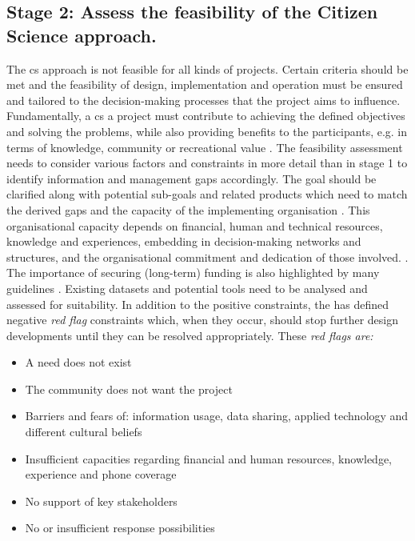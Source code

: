 \subsection{Stage 2: Assess the feasibility of the Citizen Science approach.}
The \acrlong{cs} approach is not feasible for all kinds of projects. Certain criteria should be met and the feasibility of design, implementation and operation must be ensured and tailored to the decision-making processes that the project aims to influence. Fundamentally, a \acrshort{cs} a project must contribute to achieving the defined objectives and solving the problems, while also providing benefits to the participants, e.g. in terms of knowledge, community or recreational value \autocite{escaeuropeancitizenscienceassociationTenPrinciplesCitizen2015,fraislCitizenScienceEnvironmental2022}. The feasibility assessment needs to consider various factors and constraints in more detail than in stage 1 to identify information and management gaps accordingly. The goal should be clarified along with potential sub-goals and related products which need to match the derived gaps and the capacity of the implementing organisation \autocite{ifrcCommunityBasedSurveillanceGuiding2017,minkmanCitizenScienceWater2015}. This organisational capacity depends on financial, human and technical resources, knowledge and experiences, embedding in decision-making networks and structures, and the organisational commitment and dedication of those involved. \autocite{fraislCitizenScienceEnvironmental2022,ifrcCommunityBasedSurveillanceGuiding2017}. The importance of securing (long-term) funding is also highlighted by many guidelines \autocite{cervoniImplementingIntegratedWater2008,minkmanCitizenScienceWater2015,sharpeCommunityBasedEcological2006, whitelawEstablishingCanadianCommunity2003}. Existing datasets and potential tools need to be analysed and assessed for suitability. In addition to the positive constraints, the \autocite{ ifrcCommunityBasedSurveillanceGuiding2017} has defined negative \textit{red flag} constraints which, when they occur, should stop further design developments until they can be resolved appropriately. These \textit{red flags are:}

\begin{itemize}
    \item A need does not exist
    \item The community does not want the project
    \item Barriers and fears of: information usage, data sharing, applied technology and different cultural beliefs
    \item Insufficient capacities regarding financial and human resources, knowledge, experience and phone coverage
    \item No support of key stakeholders
    \item No or insufficient response possibilities
\end{itemize}

